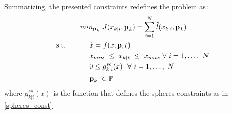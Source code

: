 Summarizing, the presented constraints redefines the problem as:
\begin{equation} %
	\begin{split}
			& min_{\textbf{p}_k}\ J({x}_{k|i},\textbf{p}_k) = \sum_{i=1}^{N}\tilde{l}({x}_{k|i},\textbf{p}_k) \\
			\textnormal{s.t.}\qquad
			&\ \ \ \ \dot{{x}}=\tilde{f}({x},\textbf{p},t) \\
			&\ \ \ \ {x}_{min}\ \leq\ x_{k|i}\ \leq\ {x}_{max}\  \forall\ i=1,\dots,\ N  \\
			&\ \ \ \ 0 \leq g^{sc}_{k|i}(x)\ \ \forall\ i=1,\dots,\ N \\
			&\ \ \ \ \textbf{p}_k\   \in \mathbb{P}\ \\
	\end{split}	
\end{equation}
where $g^{sc}_{k|i}(x)$ is the function that defines the spheres constraints as in \ref{spheres_const}

